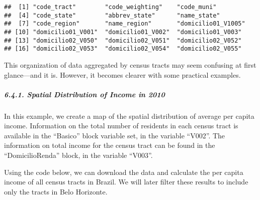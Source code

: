 \documentclass[
]{article}
\begin{document}
\begin{verbatim}
##  [1] "code_tract"        "code_weighting"    "code_muni"        
##  [4] "code_state"        "abbrev_state"      "name_state"       
##  [7] "code_region"       "name_region"       "domicilio01_V1005"
## [10] "domicilio01_V001"  "domicilio01_V002"  "domicilio01_V003" 
## [13] "domicilio02_V050"  "domicilio02_V051"  "domicilio02_V052" 
## [16] "domicilio02_V053"  "domicilio02_V054"  "domicilio02_V055"
\end{verbatim}

This organization of data aggregated by census tracts may seem confusing
at first glance---and it is. However, it becomes clearer with some
practical examples.

\subparagraph{6.4.1. Spatial Distribution of Income in
2010}\label{spatial-distribution-of-income-in-2010}

In this example, we create a map of the spatial distribution of average
per capita income. Information on the total number of residents in each
census tract is available in the ``Basico'' block variable set, in the
variable ``V002''. The information on total income for the census tract
can be found in the ``DomicilioRenda'' block, in the variable ``V003''.

Using the code below, we can download the data and calculate the per
capita income of all census tracts in Brazil. We will later filter these
results to include only the tracts in Belo Horizonte.
\end{document}
